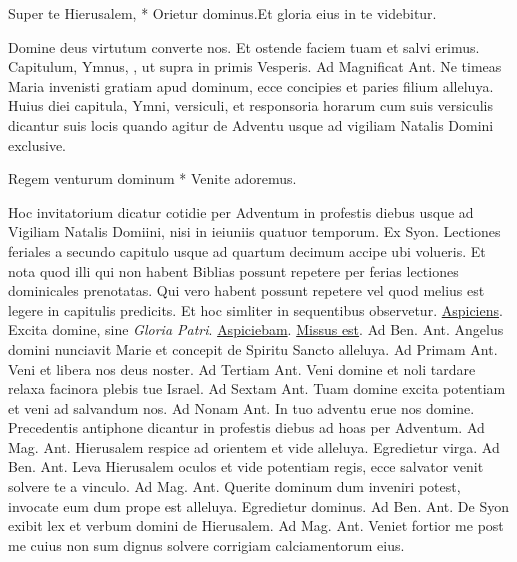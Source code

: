 \begin{multicols*}{2}
\begin{responsory-breve}
{Super te Hierusalem, * Orietur dominus.}{Et gloria eius in te videbitur.}
\end{responsory-breve}
\V Domine deus virtutum converte nos. \R Et ostende faciem tuam et salvi erimus.
 Capitulum, Ymnus, \Vbar, ut supra in primis Vesperis. {\color{Red} Ad Magnificat Ant.} Ne timeas Maria invenisti gratiam apud dominum, ecce concipies et paries filium alleluya. Huius diei capitula, Ymni, versiculi, et responsoria horarum cum suis versiculis dicantur suis locis quando agitur de Adventu usque ad vigiliam Natalis Domini exclusive.
\begin{invitatory}
{Regem venturum dominum * Venite adoremus.}
\end{invitatory}
Hoc invitatorium dicatur cotidie per Adventum in profestis diebus usque ad Vigiliam Natalis Domiini, nisi in ieiuniis quatuor temporum. \V Ex Syon.
\newline Lectiones feriales a secundo capitulo usque ad quartum decimum accipe ubi volueris. Et nota quod illi qui non habent Biblias possunt repetere per ferias lectiones dominicales prenotatas. Qui vero habent possunt repetere vel quod melius est legere in capitulis predicits. Et hoc simliter in sequentibus observetur.
\R \hyperlink{aspiciens}{Aspiciens}. \V Excita domine, sine {\itshape Gloria Patri}. \R \hyperlink{aspiciebam}{Aspiciebam}. \R \hyperlink{missus-est}{Missus est}. {\color{Red} Ad Ben. Ant.} Angelus domini nunciavit Marie et concepit de Spiritu Sancto alleluya. {\color{Red} Ad Primam Ant.} Veni et libera nos deus noster. {\color{Red} Ad Tertiam Ant.} Veni domine et noli tardare relaxa facinora plebis tue Israel. {\color{Red} Ad Sextam Ant.} Tuam domine excita potentiam et veni ad salvandum nos. {\color{Red} Ad Nonam Ant.} In tuo adventu erue nos domine.
Precedentis antiphone dicantur in profestis diebus ad hoas per Adventum. {\color{Red} Ad Mag. Ant.} Hierusalem respice ad orientem et vide alleluya.
 \V Egredietur virga. {\color{Red} Ad Ben. Ant.} Leva Hierusalem oculos et vide potentiam regis, ecce salvator venit solvere te a vinculo. {\color{Red} Ad Mag. Ant.} Querite dominum dum inveniri potest, invocate eum dum prope est alleluya.
 \V Egredietur dominus. {\color{Red} Ad Ben. Ant.} De Syon exibit lex et verbum domini de Hierusalem. {\color{Red} Ad Mag. Ant.} Veniet fortior me post me cuius non sum dignus solvere corrigiam calciamentorum eius.

\end{multicols*}
